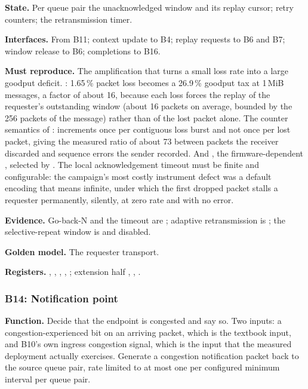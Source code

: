 \textbf{State.} Per queue pair the unacknowledged window and its replay cursor;
retry counters; the retransmission timer.

\textbf{Interfaces.} From B11; context update to B4; replay requests to B6 and
B7; window release to B6; completions to B16.

\textbf{Must reproduce.} The amplification that turns a small loss rate into a
large goodput deficit. : 1.65\,\% packet loss becomes a 26.9\,\%
goodput tax at 1\,MiB messages, a factor of about 16, because each loss forces
the replay of the requester's outstanding window (about 16 packets on average,
bounded by the 256 packets of the message) rather than of the lost packet
alone. The counter semantics of
:  increments once per contiguous loss burst and
not once per lost packet, giving the measured ratio of about 73 between packets
the receiver discarded and sequence errors the sender recorded. And ,
the firmware-dependent , selected by
. The local acknowledgement timeout must be finite and
configurable: the campaign's most costly instrument defect was a default
encoding that means infinite, under which the first dropped packet stalls a
requester permanently, silently, at zero rate and with no error.

\textbf{Evidence.} Go-back-N and the timeout are \evdoc{}; adaptive
retransmission is \evdrv{}; the selective-repeat window is \evdecl{} and
disabled.

\textbf{Golden model.} The requester transport.

{\raggedright
\textbf{Registers.} , ,
, , ;
extension half , ,
.\par}

\subsubsection{B14: Notification point}

\textbf{Function.} Decide that the endpoint is congested and say so. Two
inputs: a congestion-experienced bit on an arriving packet, which is the
textbook input, and B10's own ingress congestion signal, which is the input
that the measured deployment actually exercises. Generate a congestion
notification packet back to the source queue pair, rate limited to at most one
per configured minimum interval per queue pair.

